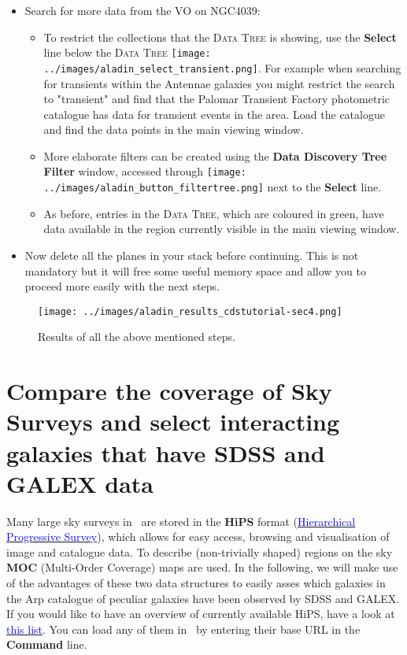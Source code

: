 \documentclass [a4paper, 12pt]{article}
\begin{document}
\begin{itemize}
    \item Search for more data from the VO on NGC4039:
    \begin{itemize}
        \item To restrict the collections that the \textsc{Data Tree} is
        showing, use the \textbf{Select} line below the
        \textsc{Data Tree} \texttt{[image: ../images/aladin\_select\_transient.png]}. For example when
        searching for transients within
        the Antennae galaxies you might restrict the search to "transient" and
        find that the Palomar Transient Factory photometric catalogue has data
        for transient events in the area. Load the catalogue and find the data
        points in the main viewing window.
        \item More elaborate filters can be created using the \textbf{Data
        Discovery Tree Filter} window, accessed through
        \texttt{[image: ../images/aladin\_button\_filtertree.png]} next to the
        \textbf{Select} line.
        \item As before, entries in the \textsc{Data Tree}, which are coloured
        in green, have data available in the region currently visible in the
        main viewing window.
    \end{itemize}
    \item Now delete all the planes in your stack before continuing. This is
    not mandatory but it will free some useful memory space and allow you to
    proceed more easily with the next steps.
\end{itemize}
\begin{figure}[H]
\center
\texttt{[image: ../images/aladin\_results\_cdstutorial-sec4.png]}
\caption{Results of all the above mentioned steps.}
\label{fig:aladinNGC4039}
\end{figure}


\section{Compare the coverage of Sky Surveys and select interacting
galaxies that have SDSS and GALEX data}

Many large sky surveys in \aladin\ are stored in the \textbf{HiPS} format
(\href{http://aladin.u-strasbg.fr/hips/}{\textcolor{blue}
	{Hierarchical Progressive Survey}}),
which allows for easy access, browsing and visualisation of image and catalogue
data. To describe (non-trivially shaped) regions on the sky \textbf{MOC}
(Multi-Order Coverage) maps are used. In the following, we will make use of the
advantages of these two data structures to easily asses which galaxies in the
Arp catalogue of peculiar galaxies have been observed by SDSS and GALEX. If you
would like to have an overview of currently available HiPS, have a look at
\href{https://aladin.u-strasbg.fr/hips/list}{\textcolor{blue}
	{this list}}. You can load any of them in
\aladin\ by entering their base URL in the \textbf{Command} line.
\end{document}
